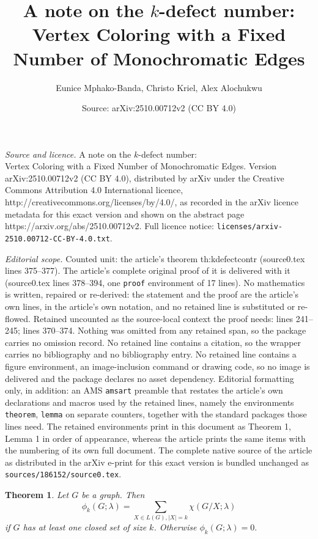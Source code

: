 \documentclass[10pt,a4paper]{amsart}
\title{A note on the $k$-defect number: \\ Vertex Coloring with a Fixed Number of Monochromatic Edges}
\author{Eunice Mphako-Banda, Christo Kriel, Alex Alochukwu}
\date{Source: arXiv:2510.00712v2 (CC BY 4.0)}
\newtheorem{theorem}{Theorem}
\begin{document}
\maketitle

\noindent\emph{Source and licence.} A note on the $k$-defect number: \\ Vertex Coloring with a Fixed Number of Monochromatic Edges. Version arXiv:2510.00712v2 (CC BY 4.0), distributed by arXiv under the Creative Commons Attribution 4.0 International licence, http://creativecommons.org/licenses/by/4.0/, as recorded in the arXiv licence metadata for this exact version and shown on the abstract page https://arxiv.org/abs/2510.00712v2. Full licence notice: \texttt{licenses/arxiv-2510.00712-CC-BY-4.0.txt}.\par\smallskip

\noindent\textit{Editorial scope.} Counted unit: the article's theorem th:kdefectcontr (source0.tex lines 375--377). The article's complete original proof of it is delivered with it (source0.tex lines 378--394, one \texttt{proof} environment of 17 lines). No mathematics is written, repaired or re-derived: the statement and the proof are the article's own lines, in the article's own notation, and no retained line is substituted or re-flowed.  Retained uncounted as the source-local context the proof needs: lines 241--245; lines 370--374.  Nothing was omitted from any retained span, so the package carries no omission record.  No retained line contains a citation, so the wrapper carries no bibliography and no bibliography entry.  No retained line contains a figure environment, an image-inclusion command or drawing code, so no image is delivered and the package declares no asset dependency.  Editorial formatting only, in addition: an AMS \texttt{amsart} preamble that restates the article's own declarations and macros used by the retained lines, namely the environments \texttt{theorem}, \texttt{lemma} on separate counters, together with the standard packages those lines need.  The retained environments print in this document as Theorem 1, Lemma 1 in order of appearance, whereas the article prints the same items with the numbering of its own full document.  The complete native source of the article as distributed in the arXiv e-print for this exact version is bundled unchanged as \texttt{sources/186152/source0.tex}.
\begin{theorem}
\label{prop2}
Let $G$ be a graph. Then  $$\phi_{k}(G;\lambda) = \sum_{X \in L(G),\vert X \vert = k} \chi (G/X; \lambda)$$
if $G$ has at least one closed set  of size $k$. Otherwise $\phi_{k}(G;\lambda) = 0.$
\end{theorem}
\end{document}
